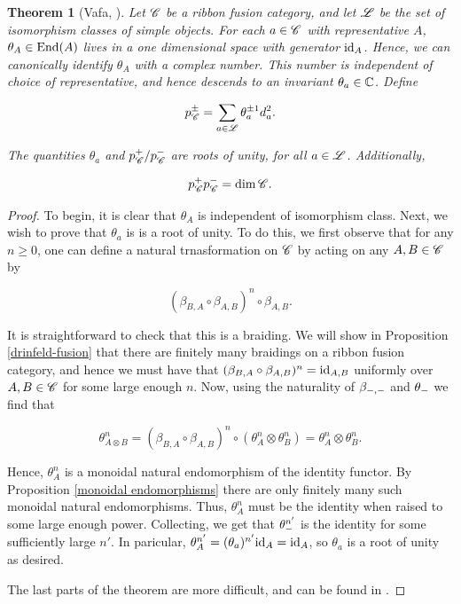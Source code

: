 \documentclass{article}
\newtheorem{theorem}{Theorem}[section]
\theoremstyle{definition}
\numberwithin{figure}{section}
\begin{document}
\begin{theorem}[Vafa, \cite{vafa1988toward}] Let $\mathscr{C}$ be a ribbon fusion category, and let $\mathscr{L}$ be the set of isomorphism classes of simple objects. For each $a\in \mathscr{C}$ with representative $A$, $\theta_A\in \mathrm{End}(A)$ lives in a one dimensional space with generator $\mathrm{id}_A$. Hence, we can canonically identify $\theta_A$ with a complex number. This number is independent of choice of representative, and hence descends to an invariant $\theta_a\in\mathbb{C}$. Define

$$p^{\pm}_{\mathscr{C}}=\sum_{a\in \mathscr{L}}\theta_a^{\pm 1}d_a^2.$$

The quantities $\theta_a$ and $p^{+}_{\mathscr{C}}/p^{-}_{\mathscr{C}}$ are roots of unity, for all $a\in \mathscr{L}$. Additionally,

$$p^{+}_{\mathscr{C}}p^{-}_{\mathscr{C}}=\dim \mathscr{C}.$$
\end{theorem}
\begin{proof} To begin, it is clear that $\theta_A$ is independent of isomorphism class. Next, we wish to prove that $\theta_a$ is is a root of unity. To do this, we first observe that for any $n\geq0$, one can define a natural trnasformation on $\mathscr{C}$ by acting on any $A,B\in\mathscr{C}$ by

$$(\beta_{B,A}\circ \beta_{A,B})^n\circ \beta_{A,B}.$$

It is straightforward to check that this is a braiding. We will show in Proposition \ref{drinfeld-fusion} that there are finitely many braidings on a ribbon fusion category, and hence we must have that $(\beta_{B,A}\circ \beta_{A,B})^n=\mathrm{id}_{A,B}$ uniformly over $A,B\in \mathscr{C}$ for some large enough $n$. Now, using the naturality of $\beta_{\--,\--}$ and $\theta_{\--}$ we find that

$$\theta_{A\otimes B}^{n}=(\beta_{B,A}\circ \beta_{A,B})^n\circ (\theta_A^n\otimes \theta_B^n)=\theta_A^n\otimes \theta_B^n.$$

Hence, $\theta_A^n$ is a monoidal natural endomorphism of the identity functor. By Proposition \ref{monoidal endomorphisms} there are only finitely many such monoidal natural endomorphisms. Thus, $\theta_A^n$ must be the identity when raised to some large enough power. Collecting, we get that $\theta_{\--}^{n'}$ is the identity for some sufficiently large $n'$. In paricular, $\theta_A^{n'}=(\theta_a)^{n'}\mathrm{id}_{A}=\mathrm{id}_{A}$, so $\theta_a$ is a root of unity as desired.

The last parts of the theorem are more difficult, and can be found in \cite[Corollary 3.1.10 (b), Theorem 3.1.19]{bakalov2001lectures}.
\end{proof}
\end{document}
